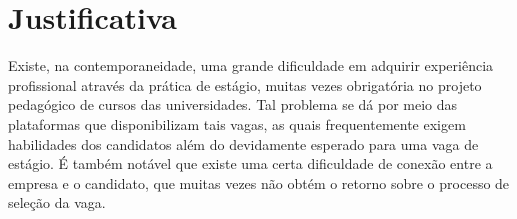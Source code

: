 \section{Justificativa}
Existe, na contemporaneidade, uma grande dificuldade em adquirir experiência profissional através da prática de estágio, muitas vezes obrigatória no projeto pedagógico de cursos das universidades. Tal problema se dá por meio das plataformas que disponibilizam tais vagas, as quais frequentemente exigem habilidades dos candidatos além do devidamente esperado para uma vaga de estágio. É também notável que existe uma certa dificuldade de conexão entre a empresa e o candidato, que muitas vezes não obtém o retorno sobre o processo de seleção da vaga.